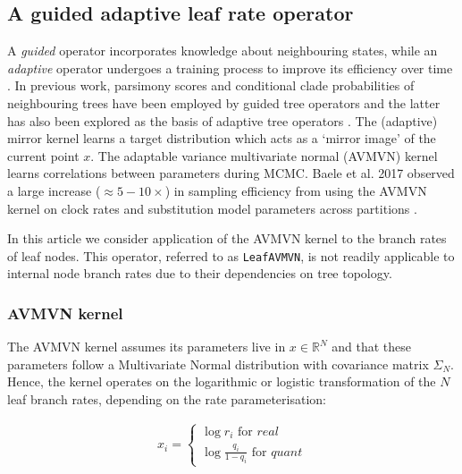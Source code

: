 \documentclass[10pt,letterpaper]{article}
\begin{document}
\clearpage
\subsection*{A guided adaptive leaf rate operator}
\label{AVMVN_sect}

A \textit{guided} operator incorporates knowledge about neighbouring states, while an \textit{adaptive} operator undergoes a training process to improve its efficiency over time \cite{roberts2007coupling}. In previous work, parsimony scores and conditional clade probabilities of neighbouring trees have been employed by guided tree operators \cite{hohna2012guided,zhang2020using,meyer2019adaptive} and the latter has also been explored as the basis of  adaptive tree operators \cite{hohna2012guided,meyer2019adaptive}. The (adaptive) mirror kernel \cite{thawornwattana2018designing} learns a target distribution which acts as a `mirror image' of the current point $x$.  The adaptable variance multivariate normal (AVMVN) kernel \cite{baele2017adaptive,suchard2018bayesian} learns correlations between parameters during MCMC. Baele et al. 2017  observed a large increase ($\approx 5-10 \times$) in sampling efficiency from using the AVMVN kernel on clock rates and substitution model parameters across partitions \cite{baele2017adaptive}.  


In this article we consider application of the AVMVN kernel to the branch rates of leaf nodes. 
This operator, referred to as \texttt{LeafAVMVN}, is not readily applicable to internal node branch rates due to their dependencies on tree topology.  




\subsubsection*{AVMVN kernel}


The AVMVN kernel assumes its parameters live in $x \in \mathbb{R}^N$ and that these parameters follow a Multivariate Normal distribution with covariance matrix $\Sigma_N$. Hence, the kernel operates on the logarithmic or logistic transformation of the $N$ leaf branch rates, depending on the rate parameterisation:

\begin{align}
	x_i = \begin{cases} \log r_i \text{ for } \textit{real} \\
						\log \frac{q_i}{1 - q_i} \text{ for } \textit{quant}  \end{cases}
\end{align}
\end{document}
